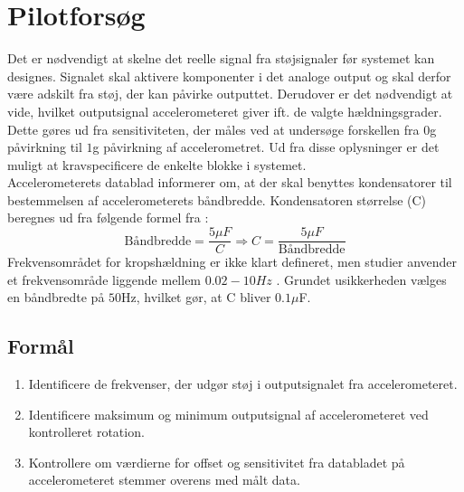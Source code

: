 \chapter{Pilotforsøg}\label{Bilag:Pilotforsoeg}
Det er nødvendigt at skelne det reelle signal fra støjsignaler før systemet kan designes. Signalet skal aktivere komponenter i det analoge output og skal derfor være adskilt fra støj, der kan påvirke outputtet. Derudover er det nødvendigt at vide, hvilket outputsignal accelerometeret giver ift. de valgte hældningsgrader. Dette gøres ud fra sensitiviteten, der måles ved at undersøge forskellen fra $0$g påvirkning til $1$g påvirkning af accelerometret. Ud fra disse oplysninger er det muligt at kravspecificere de enkelte blokke i systemet. \\ %
Accelerometerets datablad informerer om, at der skal benyttes kondensatorer til bestemmelsen af accelerometerets båndbredde. Kondensatoren størrelse (C) beregnes ud fra følgende formel fra \cite{Devices2009}:
\begin{equation}
\text{Båndbredde} = \dfrac{5\mu F}{C} \Rightarrow  C = \dfrac{5\mu F}{\text{Båndbredde}}
\end{equation}
Frekvensområdet for kropshældning er ikke klart defineret, men studier anvender et frekvensområde liggende mellem $0.02-10Hz$ \cite{Martinez-Mendez2011}. Grundet usikkerheden vælges en båndbredte på $50$Hz, hvilket gør, at C bliver $0.1\mu$F.

\section{Formål}
\begin{enumerate}
\item Identificere de frekvenser, der udgør støj i outputsignalet fra accelerometeret.
\item Identificere maksimum og minimum outputsignal af accelerometeret ved kontrolleret rotation.
\item Kontrollere om værdierne for offset og sensitivitet fra databladet på accelerometeret stemmer overens med målt data.
\end{enumerate}

